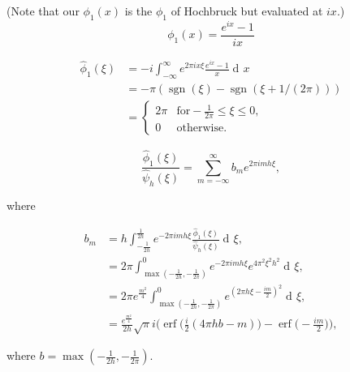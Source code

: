 \documentclass[14pt]{article}
\DeclareMathOperator{\diff}{d\!}
\DeclareMathOperator{\sgn}{sgn}
\DeclareMathOperator{\erf}{erf}
\begin{document}
(Note that our $\phi_1(x)$ is the $\phi_1$ of Hochbruck but evaluated
at $ix$.)
\begin{equation}
  \phi_1(x) = \frac{e^{i x}-1}{i x}
\end{equation}

\begin{align}
  \hat{\phi}_1(\xi) &=-i\int_{-\infty}^{\infty} e^{2\pi i x\xi}\frac{e^{i x}-1}{x}\diff x\\
  &= -\pi(\sgn(\xi) - \sgn(\xi + 1/(2\pi))) \\
  &= \begin{cases}
    2\pi & \mathrm{for} -\frac{1}{2\pi} \leq \xi \leq 0, \\
    0 & \mathrm{otherwise}.
    \end{cases}
\end{align}

\begin{equation}
  \frac{\hat{\phi}_1(\xi)}{\hat{\psi}_h(\xi)} = \sum_{m=-\infty}^{\infty}b_me^{2\pi i m h\xi},
\end{equation}

\noindent where

\begin{align}
  b_m &= h\int_{-\frac{1}{2h}}^{\frac{1}{2h}} e^{-2\pi i m h \xi}\frac{\hat{\phi}_1(\xi)}{\hat{\psi}_h(\xi)} \diff\xi, \\
  &= 2\pi\int_{\max(-\frac{1}{2h}, -\frac{1}{2\pi})}^{0} e^{-2\pi i m h \xi}e^{4\pi^2\xi^2h^2} \diff\xi, \\
  &= 2\pi e^{\frac{m^2}{4}}\int_{\max(-\frac{1}{2h}, -\frac{1}{2\pi})}^{0} e^{(2\pi h \xi - \frac{i m}{2})^2} \diff\xi, \\
  &= \frac{e^\frac{m^2}{4}}{2h}\sqrt{\pi}i\Bigg(\erf\Big(\frac{i}{2}(4\pi h b - m)\Big) - \erf\Big(-\frac{i m}{2}\Big)\Bigg),
\end{align}

\noindent where $b=\max(-\frac{1}{2h}, -\frac{1}{2\pi})$.
\end{document}
